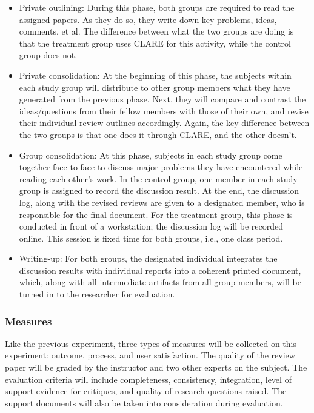 \begin{itemize}
  
\item Private outlining: During this phase, both groups are required to
  read the assigned papers. As they do so, they write down key problems,
  ideas, comments, et al. The difference between what the two groups are
  doing is that the treatment group uses CLARE for this activity, while the
  control group does not.
  
\item Private consolidation: At the beginning of this phase, the subjects
  within each study group will distribute to other group members what they
  have generated from the previous phase. Next, they will compare and
  contrast the ideas/questions from their fellow members with those of
  their own, and revise their individual review outlines accordingly.
  Again, the key difference between the two groups is that one does it
  through CLARE, and the other doesn't.
  
\item Group consolidation: At this phase, subjects in each study group
  come together face-to-face to discuss major problems they have
  encountered while reading each other's work. In the control group, one
  member in each study group is assigned to record the discussion result.
  At the end, the discussion log, along with the revised reviews are given
  to a designated member, who is responsible for the final document. For
  the treatment group, this phase is conducted in front of a workstation;
  the discussion log will be recorded online. This session is fixed time
  for both groups, i.e., one class period.
  
\item Writing-up: For both groups, the designated individual integrates
  the discussion results with individual reports into a coherent printed
  document, which, along with all intermediate artifacts from all group
  members, will be turned in to the researcher for evaluation.
\end{itemize}


\subsubsection{Measures} 

Like the previous experiment, three types of measures will be collected on
this experiment: outcome, process, and user satisfaction. The quality of
the review paper will be graded by the instructor and two other experts on
the subject. The evaluation criteria will include completeness,
consistency, integration, level of support evidence for critiques, and
quality of research questions raised. The support documents will also be
taken into consideration during evaluation.



